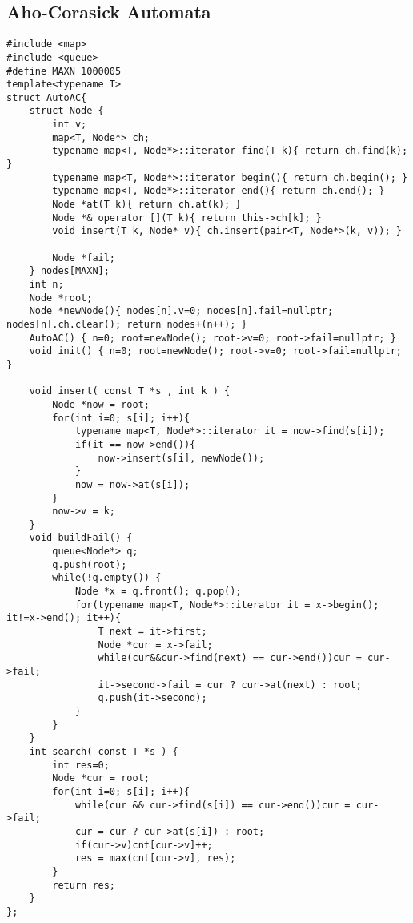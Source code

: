 \subsection{Aho-Corasick Automata}
\begin{lstlisting}
#include <map>
#include <queue>
#define MAXN 1000005
template<typename T>
struct AutoAC{
	struct Node {
		int v;
		map<T, Node*> ch;
		typename map<T, Node*>::iterator find(T k){ return ch.find(k); }
		typename map<T, Node*>::iterator begin(){ return ch.begin(); }
		typename map<T, Node*>::iterator end(){ return ch.end(); }
		Node *at(T k){ return ch.at(k); }
		Node *& operator [](T k){ return this->ch[k]; }
		void insert(T k, Node* v){ ch.insert(pair<T, Node*>(k, v)); }

		Node *fail;
	} nodes[MAXN];
	int n;
	Node *root;
	Node *newNode(){ nodes[n].v=0; nodes[n].fail=nullptr; nodes[n].ch.clear(); return nodes+(n++); }
	AutoAC() { n=0; root=newNode(); root->v=0; root->fail=nullptr; }
	void init() { n=0; root=newNode(); root->v=0; root->fail=nullptr; }

	void insert( const T *s , int k ) {
		Node *now = root;
		for(int i=0; s[i]; i++){
			typename map<T, Node*>::iterator it = now->find(s[i]);
			if(it == now->end()){
				now->insert(s[i], newNode());
			}
			now = now->at(s[i]);
		}
		now->v = k;
	}
	void buildFail() {
		queue<Node*> q;
		q.push(root);
		while(!q.empty()) {
			Node *x = q.front(); q.pop();
			for(typename map<T, Node*>::iterator it = x->begin(); it!=x->end(); it++){
				T next = it->first;
				Node *cur = x->fail;
				while(cur&&cur->find(next) == cur->end())cur = cur->fail;
				it->second->fail = cur ? cur->at(next) : root;
				q.push(it->second);
			}
		}
	}
	int search( const T *s ) {
		int res=0;
		Node *cur = root;
		for(int i=0; s[i]; i++){
			while(cur && cur->find(s[i]) == cur->end())cur = cur->fail;
			cur = cur ? cur->at(s[i]) : root;
			if(cur->v)cnt[cur->v]++;
			res = max(cnt[cur->v], res);
		}
		return res;
	}
};
\end{lstlisting}
